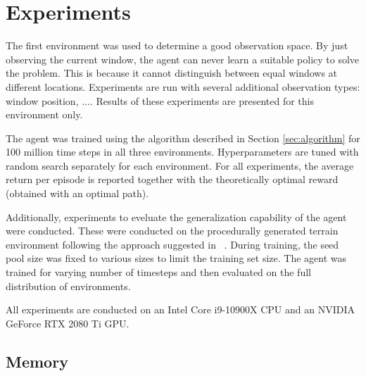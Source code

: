\section{Experiments}

The first environment was used to determine a good observation space. By just observing the current window, the agent can never learn a suitable policy to solve the problem. This is because it cannot distinguish between equal windows at different locations. Experiments are run with several additional observation types: window position, .... Results of these experiments are presented for this environment only.

The agent was trained using the algorithm described in Section \ref{sec:algorithm} for 100 million time steps in all three environments. Hyperparameters are tuned with random search separately for each environment. For all experiments, the average return per episode is reported together with the theoretically optimal reward (obtained with an optimal path).

Additionally, experiments to eveluate the generalization capability of the agent were conducted. These were conducted on the procedurally generated terrain environment following the approach suggested in ~\cite{procgen}. During training, the seed pool size was fixed to various sizes to limit the training set size. The agent was trained for varying number of timesteps and then evaluated on the full distribution of environments.

All experiments are conducted on an Intel Core i9-10900X CPU and an NVIDIA GeForce RTX 2080 Ti GPU.

\subsection{Memory}







